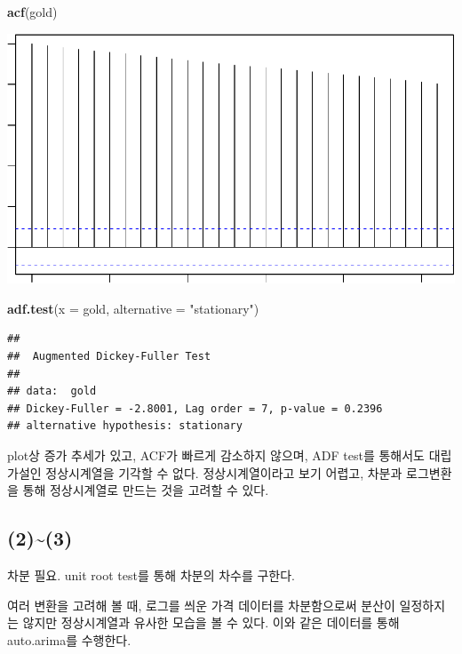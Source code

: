 \documentclass[
]{article}
\newenvironment{Shaded}{\begin{snugshade}}{\end{snugshade}}
\newcommand{\AttributeTok}[1]{\textcolor[rgb]{0.13,0.29,0.53}{#1}}
\newcommand{\FunctionTok}[1]{\textcolor[rgb]{0.13,0.29,0.53}{\textbf{#1}}}
\newcommand{\NormalTok}[1]{#1}
\newcommand{\StringTok}[1]{\textcolor[rgb]{0.31,0.60,0.02}{#1}}
\begin{document}
\begin{Shaded}
\begin{Highlighting}[]
\FunctionTok{acf}\NormalTok{(gold)}
\end{Highlighting}
\end{Shaded}

\begin{center}\includegraphics[width=0.8\linewidth]{Timeseries_Analysis_HW4_files/figure-latex/unnamed-chunk-11-2} \end{center}

\begin{Shaded}
\begin{Highlighting}[]
\FunctionTok{adf.test}\NormalTok{(}\AttributeTok{x =}\NormalTok{ gold, }\AttributeTok{alternative =} \StringTok{"stationary"}\NormalTok{)}
\end{Highlighting}
\end{Shaded}

\begin{verbatim}
## 
##  Augmented Dickey-Fuller Test
## 
## data:  gold
## Dickey-Fuller = -2.8001, Lag order = 7, p-value = 0.2396
## alternative hypothesis: stationary
\end{verbatim}

plot상 증가 추세가 있고, ACF가 빠르게 감소하지 않으며, ADF test를
통해서도 대립가설인 정상시계열을 기각할 수 없다. 정상시계열이라고 보기
어렵고, 차분과 로그변환을 통해 정상시계열로 만드는 것을 고려할 수 있다.

\subsection{(2)\textasciitilde(3)}\label{section-5}

차분 필요. unit root test를 통해 차분의 차수를 구한다.

여러 변환을 고려해 볼 때, 로그를 씌운 가격 데이터를 차분함으로써 분산이
일정하지는 않지만 정상시계열과 유사한 모습을 볼 수 있다. 이와 같은
데이터를 통해 auto.arima를 수행한다.
\end{document}
